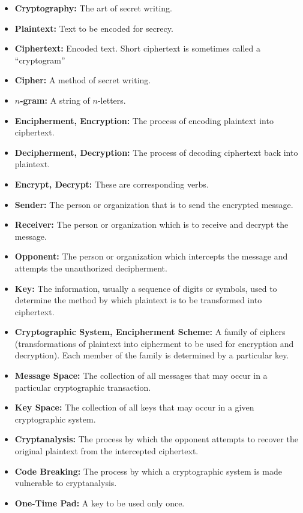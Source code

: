 \documentclass[11pt]{amsart}
\theoremstyle{definition}\newtheorem{definition}{Definition}
\theoremstyle{definition}\newtheorem{example}{Example}
\begin{document}
\begin{itemize}
    \item \textbf{Cryptography:} The art of secret writing.
    \item \textbf{Plaintext:} Text to be encoded for secrecy.
    \item \textbf{Ciphertext:} Encoded text. Short ciphertext is sometimes called a ``cryptogram''
    \item \textbf{Cipher:} A method of secret writing.
    \item \textbf{$n$-gram:} A string of $n$-letters.
    \item \textbf{Encipherment, Encryption:} The process of encoding plaintext into ciphertext.
    \item \textbf{Decipherment, Decryption:} The process of decoding ciphertext back into plaintext.
    \item \textbf{Encrypt, Decrypt:} These are corresponding verbs.
    \item \textbf{Sender:} The person or organization that is to send the encrypted message.
    \item \textbf{Receiver:} The person or organization which is to receive and decrypt the message.
    \item \textbf{Opponent:} The person or organization which intercepts the message and attempts the unauthorized decipherment.
    \item \textbf{Key:} The information, usually a sequence of digits or symbols, used to determine the method by which plaintext is to be transformed into ciphertext.
    \item \textbf{Cryptographic System, Encipherment Scheme:} A family of ciphers (transformations of plaintext into cipherment to be used for encryption and decryption). Each member of the family is determined by a particular key.
    \item \textbf{Message Space:} The collection of all messages that may occur in a particular cryptographic transaction.
    \item \textbf{Key Space:} The collection of all keys that may occur in a given cryptographic system.
    \item \textbf{Cryptanalysis:} The process by which the opponent attempts to recover the original plaintext from the intercepted ciphertext.
    \item \textbf{Code Breaking:} The process by which a cryptographic system is made vulnerable to cryptanalysis.
    \item \textbf{One-Time Pad:} A key to be used only once.
\end{itemize}
\end{document}
